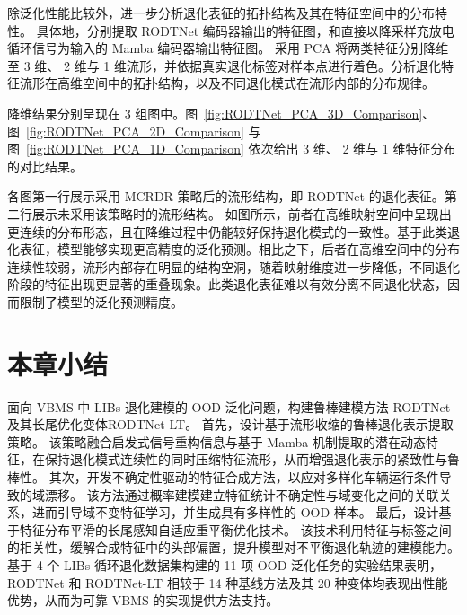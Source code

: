 除泛化性能比较外，进一步分析退化表征的拓扑结构及其在特征空间中的分布特性。
具体地，分别提取 RODTNet 编码器输出的特征图，和直接以降采样充放电循环信号为输入的 Mamba 编码器输出特征图。
采用 PCA 将两类特征分别降维至 3 维、 2 维与 1 维流形，并依据真实退化标签对样本点进行着色。分析退化特征流形在高维空间中的拓扑结构，以及不同退化模式在流形内部的分布规律。

降维结果分别呈现在 3 组图中。图~\ref{fig:RODTNet_PCA_3D_Comparison}、图~\ref{fig:RODTNet_PCA_2D_Comparison} 与图~\ref{fig:RODTNet_PCA_1D_Comparison} 依次给出 3 维、 2 维与 1 维特征分布的对比结果。

各图第一行展示采用 MCRDR 策略后的流形结构，即 RODTNet 的退化表征。第二行展示未采用该策略时的流形结构。
如图所示，前者在高维映射空间中呈现出更连续的分布形态，且在降维过程中仍能较好保持退化模式的一致性。基于此类退化表征，模型能够实现更高精度的泛化预测。相比之下，后者在高维空间中的分布连续性较弱，流形内部存在明显的结构空洞，随着映射维度进一步降低，不同退化阶段的特征出现更显著的重叠现象。此类退化表征难以有效分离不同退化状态，因而限制了模型的泛化预测精度。

\section{本章小结}\label{sec:RODTNet_conclusion}

面向 VBMS 中 LIBs 退化建模的 OOD 泛化问题，构建鲁棒建模方法 RODTNet 及其长尾优化变体RODTNet-LT。
% 
首先，设计基于流形收缩的鲁棒退化表示提取策略。
该策略融合启发式信号重构信息与基于 Mamba 机制提取的潜在动态特征，在保持退化模式连续性的同时压缩特征流形，从而增强退化表示的紧致性与鲁棒性。
% 
其次，开发不确定性驱动的特征合成方法，以应对多样化车辆运行条件导致的域漂移。
该方法通过概率建模建立特征统计不确定性与域变化之间的关联关系，进而引导域不变特征学习，并生成具有多样性的 OOD 样本。
% 
最后，设计基于特征分布平滑的长尾感知自适应重平衡优化技术。
该技术利用特征与标签之间的相关性，缓解合成特征中的头部偏置，提升模型对不平衡退化轨迹的建模能力。
% 
基于 4 个 LIBs 循环退化数据集构建的 11 项 OOD 泛化任务的实验结果表明，RODTNet 和 RODTNet-LT 相较于 14 种基线方法及其 20 种变体均表现出性能优势，从而为可靠 VBMS 的实现提供方法支持。

